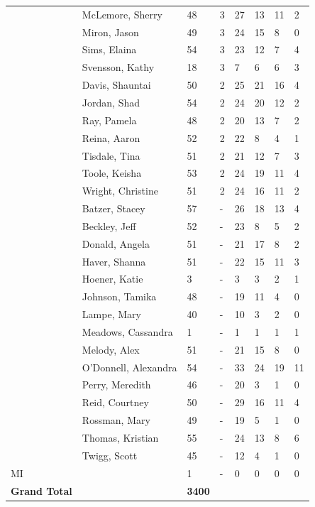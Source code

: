 \documentclass{article}\usepackage[]{graphicx}\usepackage[]{color}
\begin{document}
{\begin{longtable} { >{\raggedright}p{}p{}p{}p{}p{}p{}p{}p{}}
   \rowcolor[gray]{0.90} & McLemore, Sherry & 48 & 3 & 27 & 13 & 11 & 2 \\ 
   \rowcolor[gray]{0.90} & Miron, Jason & 49 & 3 & 24 & 15 & 8 & 0 \\ 
   \rowcolor[gray]{0.90} & Sims, Elaina & 54 & 3 & 23 & 12 & 7 & 4 \\ 
   & Svensson, Kathy & 18 & 3 & 7 & 6 & 6 & 3 \\ 
   & Davis, Shauntai & 50 & 2 & 25 & 21 & 16 & 4 \\ 
   & Jordan, Shad & 54 & 2 & 24 & 20 & 12 & 2 \\ 
   \rowcolor[gray]{0.90} & Ray, Pamela & 48 & 2 & 20 & 13 & 7 & 2 \\ 
   \rowcolor[gray]{0.90} & Reina, Aaron & 52 & 2 & 22 & 8 & 4 & 1 \\ 
   \rowcolor[gray]{0.90} & Tisdale, Tina & 51 & 2 & 21 & 12 & 7 & 3 \\ 
   & Toole, Keisha & 53 & 2 & 24 & 19 & 11 & 4 \\ 
   & Wright, Christine & 51 & 2 & 24 & 16 & 11 & 2 \\ 
   & Batzer, Stacey & 57 & - & 26 & 18 & 13 & 4 \\ 
   \rowcolor[gray]{0.90} & Beckley, Jeff & 52 & - & 23 & 8 & 5 & 2 \\ 
   \rowcolor[gray]{0.90} & Donald, Angela & 51 & - & 21 & 17 & 8 & 2 \\ 
   \rowcolor[gray]{0.90} & Haver, Shanna & 51 & - & 22 & 15 & 11 & 3 \\ 
   & Hoener, Katie & 3 & - & 3 & 3 & 2 & 1 \\ 
   & Johnson, Tamika & 48 & - & 19 & 11 & 4 & 0 \\ 
   & Lampe, Mary & 40 & - & 10 & 3 & 2 & 0 \\ 
   \rowcolor[gray]{0.90} & Meadows, Cassandra & 1 & - & 1 & 1 & 1 & 1 \\ 
   \rowcolor[gray]{0.90} & Melody, Alex & 51 & - & 21 & 15 & 8 & 0 \\ 
   \rowcolor[gray]{0.90} & O'Donnell, Alexandra & 54 & - & 33 & 24 & 19 & 11 \\ 
   & Perry, Meredith & 46 & - & 20 & 3 & 1 & 0 \\ 
   & Reid, Courtney & 50 & - & 29 & 16 & 11 & 4 \\ 
   & Rossman, Mary & 49 & - & 19 & 5 & 1 & 0 \\ 
   \rowcolor[gray]{0.90} & Thomas, Kristian & 55 & - & 24 & 13 & 8 & 6 \\ 
   \rowcolor[gray]{0.90} & Twigg, Scott & 45 & - & 12 & 4 & 1 & 0 \\ 
   \hline
MI &  & 1 & - & 0 & 0 & 0 & 0 \\ 
   \hline
\hline
\textbf{Grand Total} &  & \textbf{ 3400 } &  & {\textbf{1486} & {\textbf{823} & {\textbf{516} & {\textbf{160} \\ 
   \end{longtable}

}
\end{document}
